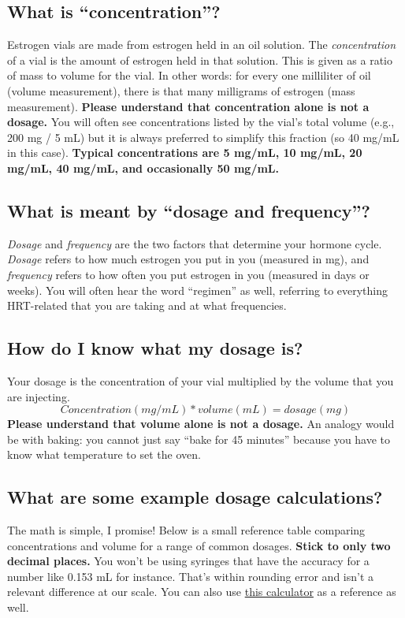 \documentclass{article}
\begin{document}
\subsection{What is “concentration”?}

Estrogen vials are made from estrogen held in an oil solution. The \textit{concentration} of a vial is the amount of estrogen held in that solution. This is given as a ratio of mass to volume for the vial. In other words: for every one milliliter of oil (volume measurement), there is that many milligrams of estrogen (mass measurement). \textbf{Please understand that concentration alone is not a dosage.} You will often see concentrations listed by the vial’s total volume (e.g., 200 mg / 5 mL) but it is always preferred to simplify this fraction (so 40 mg/mL in this case). \textbf{Typical concentrations are 5 mg/mL, 10 mg/mL, 20 mg/mL, 40 mg/mL, and occasionally 50 mg/mL.}

\subsection{What is meant by “dosage and frequency”?}

\textit{Dosage} and \textit{frequency} are the two factors that determine your hormone cycle. \textit{Dosage} refers to how much estrogen you put in you (measured in mg), and \textit{frequency} refers to how often you put estrogen in you (measured in days or weeks). You will often hear the word “regimen” as well, referring to everything HRT-related that you are taking and at what frequencies.

\subsection{How do I know what my dosage is?}

Your dosage is the concentration of your vial multiplied by the volume that you are injecting. \[Concentration (mg/mL) * volume (mL) = dosage (mg)\] \textbf{Please understand that volume alone is not a dosage.} An analogy would be with baking: you cannot just say “bake for 45 minutes” because you have to know what temperature to set the oven.

\subsection{What are some example dosage calculations?}

The math is simple, I promise! Below is a small reference table comparing concentrations and volume for a range of common dosages. \textbf{Stick to only two decimal places.} You won’t be using syringes that have the accuracy for a number like 0.153 mL for instance. That’s within rounding error and isn’t a relevant difference at our scale. You can also use \href{https://web.archive.org/web/20260307075103/https://hrtcafe.net/Calc/}{this calculator} as a reference as well.
\end{document}
